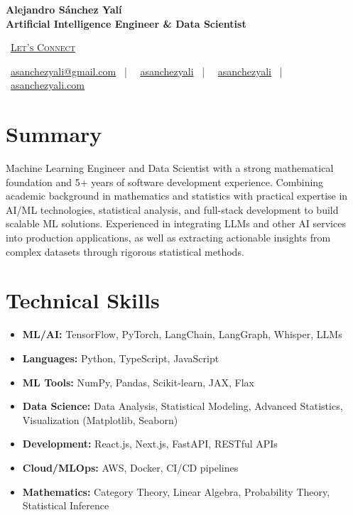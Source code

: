 \documentclass[letterpaper,11pt]{article}
\newcommand{\normalfaCalendar}{{\mdseries\faCalendar}}
\newcommand{\normalfaEnvelope}{{\mdseries\faEnvelope}}
\newcommand{\normalfaLinkedin}{{\mdseries\faLinkedin}}
\newcommand{\normalfaGithub}{{\mdseries\faGithub}}
\newcommand{\normalfaGlobe}{{\mdseries\faGlobe}}
\begin{document}
\begin{center}
\textbf{\Huge Alejandro Sánchez Yalí}\\[0.3em]
\textbf{\Large Artificial Intelligence Engineer \& Data Scientist}\\[0.5em]
\small

\normalfaCalendar\ \href{https://cal.com/asanchezyali/full-time-opportunities}{\textsc{Let's Connect}}

\vspace{1em}

\normalfaEnvelope\ \href{mailto:asanchezyali@gmail.com}{asanchezyali@gmail.com}  ~|~
\normalfaLinkedin\ \href{https://www.linkedin.com/in/asanchezyali}{asanchezyali} ~|~
\normalfaGithub\ \href{https://github.com/asanchezyali}{asanchezyali}  ~|~
\normalfaGlobe\ \href{https://asanchezyali.com}{asanchezyali.com} 

\end{center}

\section{Summary}
Machine Learning Engineer and Data Scientist with a strong mathematical foundation and 5+ years of software development experience. Combining academic background in mathematics and statistics with practical expertise in AI/ML technologies, statistical analysis, and full-stack development to build scalable ML solutions. Experienced in integrating LLMs and other AI services into production applications, as well as extracting actionable insights from complex datasets through rigorous statistical methods.

\section{Technical Skills}
\begin{itemize}[leftmargin=*]
  \item \textbf{ML/AI:} TensorFlow, PyTorch, LangChain, LangGraph, Whisper, LLMs
  \item \textbf{Languages:} Python, TypeScript, JavaScript
  \item \textbf{ML Tools:} NumPy, Pandas, Scikit-learn, JAX, Flax
  \item \textbf{Data Science:} Data Analysis, Statistical Modeling, Advanced Statistics, Visualization (Matplotlib, Seaborn)
  \item \textbf{Development:} React.js, Next.js, FastAPI, RESTful APIs
  \item \textbf{Cloud/MLOps:} AWS, Docker, CI/CD pipelines
  \item \textbf{Mathematics:} Category Theory, Linear Algebra, Probability Theory, Statistical Inference
\end{itemize}
\end{document}
